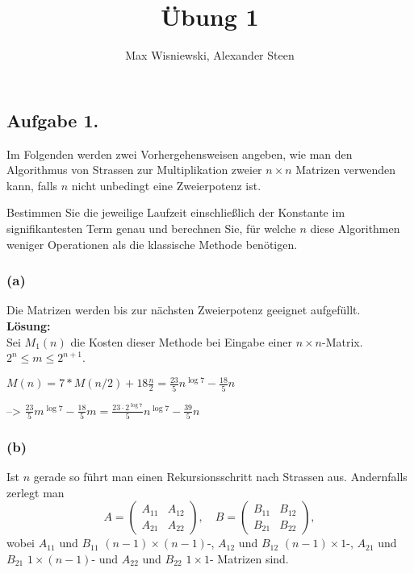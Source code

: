\documentclass[11pt,a4paper,ngerman]{article}
\date{}
\title{Übung 1}
\author{Max Wisniewski, Alexander Steen}
\begin{document}

\renewcommand{\figurename}{Figure}

\maketitle
\thispagestyle{fancy}

\subsection*{Aufgabe 1.}

Im Folgenden werden zwei Vorhergehensweisen angeben, wie man den Algorithmus
von Strassen zur Multiplikation zweier $n \times n$ Matrizen verwenden kann, falls
$n$ nicht unbedingt eine Zweierpotenz ist.

Bestimmen Sie die jeweilige Laufzeit einschließlich der Konstante im signifikantesten
Term genau und berechnen Sie, für welche $n$ diese Algorithmen weniger Operationen als
die klassische Methode benötigen.

\subsubsection*{(a)}

Die Matrizen werden bis zur nächsten Zweierpotenz geeignet aufgefüllt.\\

\textbf{Lösung:}\\
Sei $M_1(n)$ die Kosten dieser Methode bei Eingabe einer $n \times n$-Matrix.
 $2^n \leq m \leq 2^{n+1}$.


$M(n) = 7*M(n/2) + 18 \frac{n}{2} = \frac{23}{5}n^{\log 7} - \frac{18}{5}n$

--> $\frac{23}{5}m^{\log 7} - \frac{18}{5}m = \frac{23\cdot 2^{\log 7}}{5} n^{\log 7} - \frac{39}{5}n$

\subsubsection*{(b)}

Ist $n$ gerade so führt man einen Rekursionsschritt nach Strassen aus.
Andernfalls zerlegt man
$$
A = \left( \begin{array}{cc} A_{11} & A_{12}\\A_{21} & A_{22}\end{array} \right),
\quad
B = \left( \begin{array}{cc} B_{11} & B_{12}\\B_{21} & B_{22}\end{array} \right),
$$
wobei $A_{11}$ und $B_{11}$ $(n-1) \times (n-1)$-, $A_{12}$ und $B_{12}$ $(n-1)\times 1$-, $A_{21}$ und $B_{21}$ $1\times (n-1)$- und $A_{22}$ und $B_{22}$ $1 \times 1$- Matrizen sind.
\end{document}
